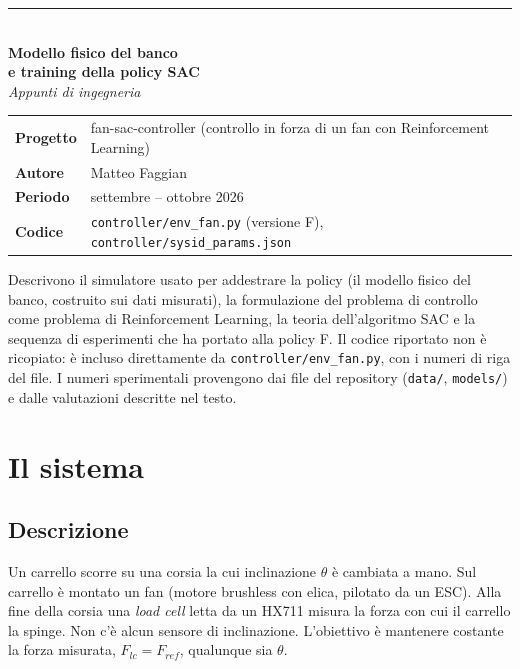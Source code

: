 \documentclass[11pt,a4paper]{article}
\newcommand{\code}[1]{\texttt{\small #1}}
\begin{document}
\begin{titlepage}
\vspace*{3cm}
{\color{brick}\rule{3cm}{3pt}}\\[0.8em]
{\Huge\bfseries\color{navy} Modello fisico del banco\\[0.2em] e training della policy SAC}\\[1.2em]
{\Large\itshape Appunti di ingegneria}\\[3em]
\begin{tabular}{@{}ll}
\textbf{Progetto} & fan-sac-controller (controllo in forza di un fan con Reinforcement Learning)\\
\textbf{Autore}   & Matteo Faggian\\
\textbf{Periodo}  & settembre -- ottobre 2026\\
\textbf{Codice}   & \code{controller/env\_fan.py} (versione F), \code{controller/sysid\_params.json}\\
\end{tabular}
\vfill
\begin{nota}
Descrivono il simulatore usato per addestrare la policy (il modello fisico del banco, costruito
sui dati misurati), la formulazione del problema di controllo come problema di Reinforcement
Learning, la teoria dell'algoritmo SAC e la sequenza di esperimenti che ha portato alla policy F.
Il codice riportato non è ricopiato: è incluso direttamente da \code{controller/env\_fan.py}, con
i numeri di riga del file. I numeri sperimentali provengono dai file del repository
(\code{data/}, \code{models/}) e dalle valutazioni descritte nel testo.
\end{nota}
\end{titlepage}

\tableofcontents
\newpage

\section{Il sistema}

\subsection{Descrizione}
Un carrello scorre su una corsia la cui inclinazione $\theta$ è cambiata a mano. Sul carrello è
montato un fan (motore brushless con elica, pilotato da un ESC). Alla fine della corsia una
\emph{load cell} letta da un HX711 misura la forza con cui il carrello la spinge. Non c'è alcun
sensore di inclinazione. L'obiettivo è mantenere costante la forza misurata,
$F_{lc} = F_{ref}$, qualunque sia $\theta$.
\end{document}
